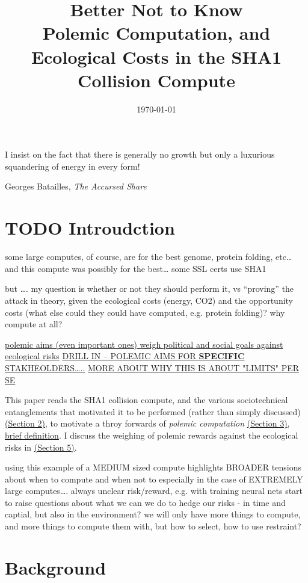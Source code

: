 \documentclass[sigconf]{acmart}
\date{\today}
\title{Better Not to Know\\\medskip
\large Polemic Computation, and Ecological Costs in the SHA1 Collision Compute}
\begin{document}
\maketitle

\epigraph{I insist on the fact that there is generally no growth but only a luxurious squandering of energy in every form!}{Georges Batailles, \textit{The Accursed Share}}

\section{{\bfseries\sffamily TODO} Introudction}
\label{sec:org216e039}

some large computes, of course, are for the best
genome, protein folding, etc\ldots{}
and this compute was possibly for the best\ldots{} some SSL certs use SHA1

but \ldots{}.
my question is whether or not they should perform it, 
vs ``proving'' the attack in theory,
given the ecological costs (energy, CO2) and the opportunity costs (what else could they could have computed, e.g. protein folding)?
why compute at all?


\uline{polemic aims (even important ones) weigh political and social goals against ecological risks}
\uline{DRILL IN -- POLEMIC AIMS FOR \textbf{SPECIFIC} STAKHEOLDERS\ldots{}..}
\uline{MORE ABOUT WHY THIS IS ABOUT "LIMITS" PER SE}


This paper reads the SHA1 collision compute, and the various sociotechnical entanglements that motivated it to be performed (rather than simply discussed) \uline{(Section 2)},
to motivate a throy forwards of \emph{polemic computation} \uline{(Section 3)}, 
\uline{brief definition}.
I discuss the weighing of polemic rewards against the ecological risks in \uline{(Section 5)}.

using this example of a MEDIUM sized compute
highlights BROADER tensions about when to compute and when not to
especially in the case of EXTREMELY large computes\ldots{}.
always unclear risk/reward, e.g. with training neural nets
start to raise questions about what we can we do to hedge our risks - in time and captial, but also in the environment?
we will only have more things to compute,
and more things to compute them with,
but how to select, how to use restraint?


\section{Background}
\label{sec:orgc504eda}
\end{document}
